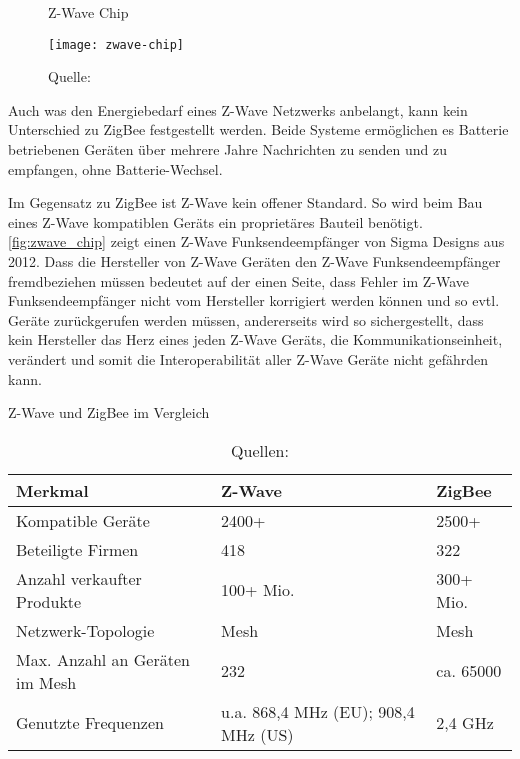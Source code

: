 \begin{wrapfigure}{r}{0.35\textwidth}
	\centering
	\caption{Z-Wave Chip}
	\texttt{[image: zwave-chip]}
	\caption*{\footnotesize{Quelle: }}
	\label{fig:zwave_chip}
\end{wrapfigure}

Auch was den Energiebedarf eines Z-Wave Netzwerks anbelangt, kann kein Unterschied zu ZigBee festgestellt werden.
Beide Systeme ermöglichen es Batterie betriebenen Geräten über mehrere Jahre Nachrichten zu senden und zu empfangen, ohne Batterie-Wechsel.

Im Gegensatz zu ZigBee ist Z-Wave kein offener Standard.
So wird beim Bau eines Z-Wave kompatiblen Geräts ein proprietäres Bauteil benötigt.
\autoref{fig:zwave_chip} zeigt einen Z-Wave Funksendeempfänger von Sigma Designs aus 2012.
Dass die Hersteller von Z-Wave Geräten den Z-Wave Funksendeempfänger fremdbeziehen müssen bedeutet auf der einen Seite, dass Fehler im Z-Wave Funksendeempfänger nicht vom Hersteller korrigiert werden können und so evtl. Geräte zurückgerufen werden müssen, andererseits wird so sichergestellt, dass kein Hersteller das Herz eines jeden Z-Wave Geräts, die Kommunikationseinheit, verändert und somit die Interoperabilität aller Z-Wave Geräte nicht gefährden kann.

\begin{table}[ht]
	\caption{Z-Wave und ZigBee im Vergleich}
	\centering
	\begin{tabular}{| p{} | p{} | p{} |}
		\hline
		\textbf{Merkmal} 	& \textbf{Z-Wave} & \textbf{ZigBee} \\ \hline
		Kompatible Geräte & 2400+ & 2500+ \\ \hline
		Beteiligte Firmen & 418 & 322 \\ \hline
		Anzahl verkaufter Produkte & 100+ Mio.& 300+ Mio.\\ \hline
		Netzwerk-Topologie & Mesh & Mesh \\ \hline
		Max. Anzahl an Geräten im Mesh & 232 & ca. 65000 \\ \hline
		Genutzte Frequenzen & u.a. 868,4 MHz (EU); 908,4 MHz (US) & 2,4 GHz \\ \hline
	\end{tabular}
	\caption*{\footnotesize{Quellen: }}
	\label{tab:zwave_vs_zigbee}
\end{table}

